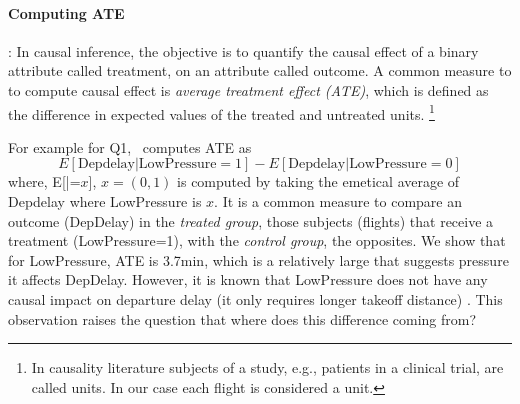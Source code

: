  \paragraph{ \bf Computing ATE}: In causal inference, the objective is to quantify
 the causal effect of a binary attribute called treatment, on an attribute called outcome.
 A common measure to to compute causal effect is {\em average treatment effect (ATE)}, which is defined as the difference in expected values of the treated and untreated units. \footnote{In causality literature subjects of a study,
  e.g., patients in a clinical trial, are called units. In our case each flight is considered a unit.}

  For example for Q1, \GSQL\ computes ATE as $$E[\text{Depdelay}|\text{LowPressure}=1] - E[\text{Depdelay}|\text{LowPressure}=0]$$
  where, E[|=$x$], $x=(0,1)$ is computed by taking the emetical average of  Depdelay where LowPressure is  $x$. It is a  common measure to compare an
  outcome (DepDelay) in the {\em treated group},  those subjects (flights) that receive a treatment (LowPressure=1), with the {\em control group}, the opposites.
  We show that for LowPressure, ATE is 3.7min, which is a relatively large that suggests pressure it affects DepDelay. However, it is known that
  LowPressure does not have any causal impact on departure delay (it only requires longer takeoff distance) \cite{FAA08}. This observation raises the question that  where does this difference coming from?



